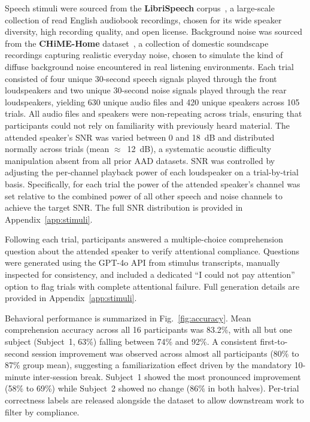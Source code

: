 \documentclass{article}
\begin{document}

Speech stimuli were sourced from the \textbf{LibriSpeech}
corpus~\cite{panayotov2015librispeech}, a large-scale collection of
read English audiobook recordings, chosen for its wide speaker diversity,
high recording quality, and open license. Background noise was sourced from
the \textbf{CHiME-Home} dataset~\cite{foster2015chime}, a collection of
domestic soundscape recordings capturing realistic everyday noise, chosen
to simulate the kind of diffuse background noise encountered in real
listening environments. Each trial consisted of four unique 30-second
speech signals played through the front loudspeakers and two unique
30-second noise signals played through the rear loudspeakers, yielding
630 unique audio files and 420 unique speakers across 105 trials. All
audio files and speakers were non-repeating across trials, ensuring that
participants could not rely on familiarity with previously heard material. The attended speaker's SNR was varied between 0 and 18~dB and distributed normally across trials (mean 
$\approx$~12~dB), a systematic acoustic difficulty manipulation absent from 
all prior AAD datasets. SNR was controlled by adjusting the per-channel playback power of each loudspeaker
on a trial-by-trial basis. Specifically, for each trial the power of the
attended speaker's channel was set relative to the combined power of all
other speech and noise channels to achieve the target SNR. The full SNR distribution is provided in 
Appendix~\ref{app:stimuli}.

Following each trial, participants answered a multiple-choice comprehension 
question about the attended speaker to verify attentional compliance. Questions 
were generated using the GPT-4o API from stimulus transcripts, manually 
inspected for consistency, and included a dedicated ``I could not pay 
attention'' option to flag trials with complete attentional failure. Full 
generation details are provided in Appendix~\ref{app:stimuli}.

Behavioral performance is summarized in Fig.~\ref{fig:accuracy}. Mean 
comprehension accuracy across all 16 participants was 83.2\%, with all but 
one subject (Subject~1, 63\%) falling between 74\% and 92\%. A consistent 
first-to-second session improvement was observed across almost all participants 
(80\% to 87\% group mean), suggesting a familiarization effect driven by 
the mandatory 10-minute inter-session break. Subject~1 showed the most 
pronounced improvement (58\% to 69\%) while Subject~2 showed no change 
(86\% in both halves). Per-trial correctness labels are released alongside 
the dataset to allow downstream work to filter by compliance.
\end{document}
